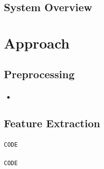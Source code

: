 \documentclass{beamer}
\begin{document}
\subsection{System Overview}
\begin{frame}

\end{frame}

\begin{frame}

\end{frame}

\section{Approach} 
\subsection{Preprocessing}
\begin{frame}
\frametitle{} 

\begin{itemize}
    \item 
  \end{itemize} 
\end{frame}

\begin{frame} [fragile] \frametitle{ } 

\end{frame}

\begin{frame} [fragile] \frametitle{ } 

\end{frame}

\begin{frame} [fragile] \frametitle{ } 

\end{frame}

\subsection{Feature Extraction}
\begin{frame} [fragile] \frametitle{} 

\begin{lstlisting}[frame=single,basicstyle=\tiny,language=C++]
CODE
\end{lstlisting}
\end{frame}

\begin{frame} [fragile] 
\frametitle{} 

\begin{lstlisting}[frame=single,basicstyle=\tiny,language=C++]
CODE
\end{lstlisting}
\end{frame}
\end{document}
